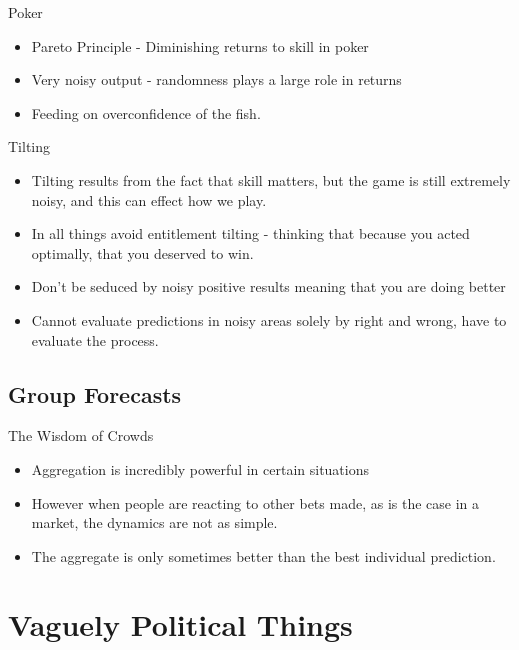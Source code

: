 \documentclass[bigger]{beamer}
\begin{document}
\begin{frame}[label=sec-4-3-1]{Poker}
\begin{itemize}
\item Pareto Principle - Diminishing returns to skill in poker
\item Very noisy output - randomness plays a large role in returns
\item Feeding on overconfidence of the fish.
\end{itemize}
\end{frame}

\begin{frame}[label=sec-4-3-2]{Tilting}
\begin{itemize}
\item Tilting results from the fact that skill matters, but the game is
still extremely noisy, and this can effect how we play.
\item In all things avoid entitlement tilting - thinking that because you
acted optimally, that you deserved to win.
\item Don't be seduced by noisy positive results meaning that you are
doing better
\item Cannot evaluate predictions in noisy areas solely by right and
wrong, have to evaluate the process.
\end{itemize}
\end{frame}

\subsection{Group Forecasts}
\label{sec-4-4}

\begin{frame}[label=sec-4-4-1]{The Wisdom of Crowds}
\begin{itemize}
\item Aggregation is incredibly powerful in certain situations
\item However when people are reacting to other bets made, as is the case
in a market, the dynamics are not as simple.
\item The aggregate is only sometimes better than the best individual prediction.
\end{itemize}
\end{frame}


\section{Vaguely Political Things}
\label{sec-5}
\end{document}
